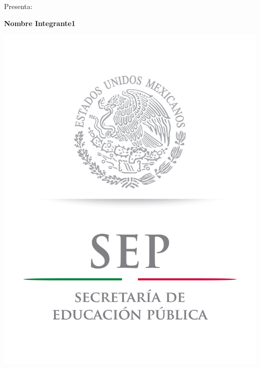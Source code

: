 \documentclass[12pt]{article}
\begin{document}
\vspace{-0.8cm}	


\begin{center}
\vspace{0.7cm}	
\hspace{2.5cm}
Presenta:
\end{center}

\begin{center}	
\hspace{2.7cm}
\large{\textbf{Nombre Integrante1} }

%
%
\end{center}

\vspace{2.1cm}
\begin{flushleft}
\includegraphics[scale = 0.2]{SEP}
\end{flushleft}	
 
\end{document}
